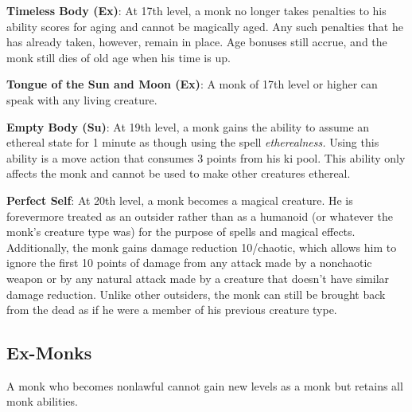 \textbf{Timeless Body (Ex)}: At 17th level, a monk no longer takes penalties to his ability scores for aging and cannot be magically aged. Any such penalties that he has already taken, however, remain in place. Age bonuses still accrue, and the monk still dies of old age when his time is up.
				
\textbf{Tongue of the Sun and Moon (Ex)}: A monk of 17th level or higher can speak with any living creature.
				
\textbf{Empty Body (Su)}: At 19th level, a monk gains the ability to assume an ethereal state for 1 minute as though using the spell \textit{etherealness.} Using this ability is a move action that consumes 3 points from his ki pool. This ability only affects the monk and cannot be used to make other creatures ethereal.
				
\textbf{Perfect Self}: At 20th level, a monk becomes a magical creature. He is forevermore treated as an outsider rather than as a humanoid (or whatever the monk's creature type was) for the purpose of spells and magical effects. Additionally, the monk gains damage reduction 10/chaotic, which allows him to ignore the first 10 points of damage from any attack made by a nonchaotic weapon or by any natural attack made by a creature that doesn't have similar damage reduction. Unlike other outsiders, the monk can still be brought back from the dead as if he were a member of his previous creature type.
				
\subsection{Ex-Monks}

				
A monk who becomes nonlawful cannot gain new levels as a monk but retains all monk abilities.
        	
